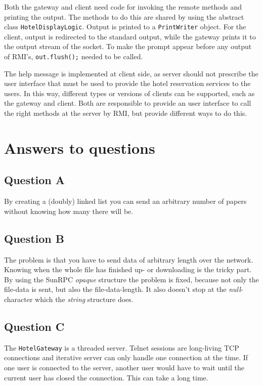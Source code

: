 \documentclass[11pt]{article}
\begin{document}
Both the gateway and client need code for invoking the remote methods and printing the output. The methods to do this are shared by using the abstract class \texttt{HotelDisplayLogic}. Output is printed to a \texttt{PrintWriter} object. For the client, output is redirected to the standard output, while the gateway prints it to the output stream of the socket. To make the prompt appear before any output of RMI's, \texttt{out.flush();} needed to be called.

The help message is implemented at client side, as server should not prescribe the user interface that must be used to provide the hotel reservation services to the users. In this way, different types or versions of clients can be supported, such as the gateway and client. Both are responsible to provide an user interface to call the right methods at the server by RMI, but provide different ways to do this.

\section{Answers to questions}
\subsection{Question A}
By creating a (doubly) linked list you can send an arbitrary number of papers without knowing how many there will be.
\subsection{Question B}
The problem is that you have to send data of arbitrary length over the network. Knowing when the whole file has finished up- or downloading is the tricky part. By using the SunRPC \textit{opaque} structure the problem is fixed, because not only the file-data is sent, but also the file-data-length. It also doesn't stop at the \textit{null}-character which the \textit{string} structure does.

\subsection{Question C}

The \texttt{HotelGateway} is a threaded server. Telnet sessions are long-living TCP connections and iterative server can only handle one connection at the time. If one user is connected to the server, another user would have to wait until the current user has closed the connection. This can take a long time.
\end{document}
